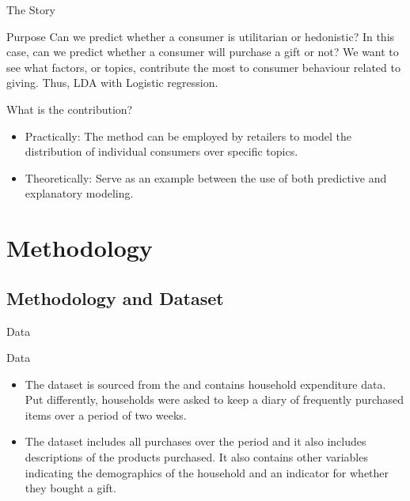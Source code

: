 \documentclass{beamer}
\begin{document}
\begin{frame}{The Story}
\begin{block}{Purpose}
Can we predict whether a consumer is utilitarian or hedonistic? In this case, can we predict whether a consumer will purchase a gift or not? We want to see what factors, or topics, contribute the most to consumer behaviour related to giving. Thus, LDA with Logistic regression. 
\end{block}

\begin{block}{What is the contribution?}
\begin{itemize}
\item Practically: The method can be employed by retailers to model the distribution of individual consumers over specific topics. 
\item Theoretically: Serve as an example between the use of both predictive and explanatory modeling. 
\end{itemize}
\end{block}

\vskip 1cm
\end{frame}




 




\section{Methodology} %
\label{sec:the_maths}




\subsection{Methodology and Dataset}
\begin{frame}{Data}
\begin{block}{Data}
\begin{itemize}
\item The dataset is sourced from the \cite{bls} and contains household expenditure data. Put differently, households were asked to keep a diary of frequently purchased items over a period of two weeks. 
\item The dataset includes all purchases over the period and it also includes descriptions of the products purchased. It also contains other variables indicating the demographics of the household and an indicator for whether they bought a gift. 
\end{itemize}
\end{block}
\end{frame}
\end{document}
